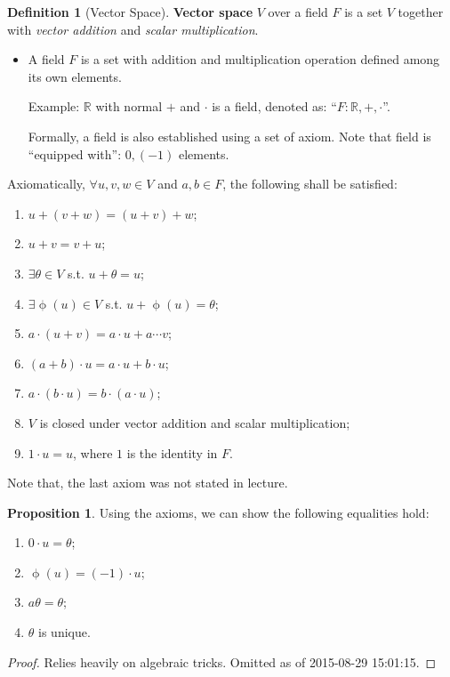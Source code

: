 \documentclass[12pt]{article}
\newcommand{\R}{{\mathbb R}}
\theoremstyle{definition}
\newtheorem{definition}[theorem]{Definition}
\newtheorem{proposition}[theorem]{Proposition}
\theoremstyle{plain}
\begin{document}
\begin{definition}
    [Vector Space]
    \textbf{Vector space} $V$ over a field $F$ is a set $V$ together with
    \textit{vector addition} and \textit{scalar multiplication}.
    \begin{itemize}
        \item A field $F$ is a set with addition and multiplication operation
            defined among its own elements.

            Example: $\R$ with normal $+$ and $\cdot$ is a field, denoted as:
            ``$F:\R, +, \cdot$''.

            Formally, a field is also established using a set of axiom. Note
            that field is ``equipped with'': $0, (-1)$ elements.
    \end{itemize}

    Axiomatically, $\forall u,v,w \in V$ and $a,b \in F$, the following shall be
    satisfied:
    \begin{enumerate}
        \item $u + (v+w) = (u+v) + w$;
        \item $u + v = v  + u$;
        \item $\exists \theta \in V$ s.t. $u + \theta = u$;
        \item $\exists \upphi (u) \in V$ s.t. $u + \upphi(u) = \theta$;
        \item $a\cdot(u+v) = a\cdot u + a\cdots v$;
        \item $(a+b) \cdot u = a\cdot u + b \cdot u$;
        \item $a\cdot (b \cdot u) = b \cdot (a \cdot u)$;
        \item $V$ is closed under vector addition and scalar multiplication;
        \item $1 \cdot u  = u$, where $1$ is the identity in $F$.
    \end{enumerate}

    Note that, the last axiom was not stated in lecture.
\end{definition}

\begin{proposition}
    Using the axioms, we can show the following equalities hold:
    \begin{enumerate}
        \item $0 \cdot u = \theta$;
        \item $\upphi (u) = (-1) \cdot u$;
        \item $a\theta  = \theta$;
        \item $\theta$ is unique.
    \end{enumerate}
    \begin{proof}
        Relies heavily on algebraic tricks. Omitted as of  2015-08-29 15:01:15.
    \end{proof}
\end{proposition}
\end{document}
